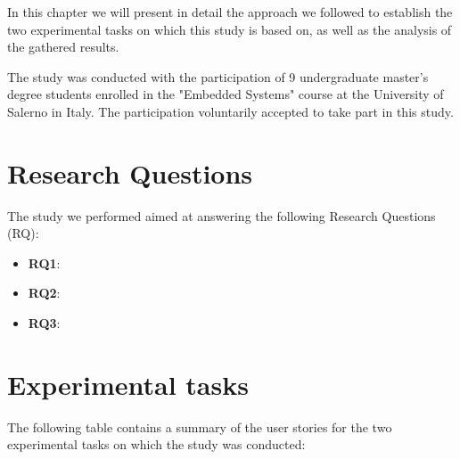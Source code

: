 In this chapter we will present in detail the approach we followed to establish the two experimental tasks on which this study is based on, as well as the analysis of the gathered results.

The study was conducted with the participation of 9 undergraduate master's degree students enrolled in the "Embedded Systems" course at the University of Salerno in Italy. The participation voluntarily accepted to take part in this study.





\section{Research Questions}
The study we performed aimed at answering the following Research Questions (RQ):
\begin{itemize}
    \item \textbf{RQ1}:
    \item \textbf{RQ2}:
    \item \textbf{RQ3}:
\end{itemize}




\section{Experimental tasks}
The following table contains a summary of the user stories for the two experimental tasks on which the study was conducted:

